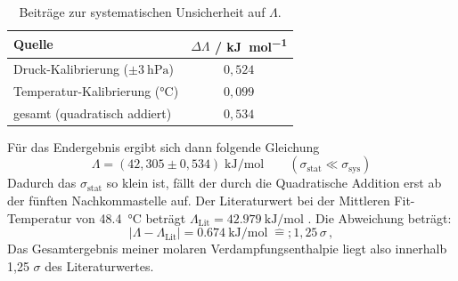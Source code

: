 \documentclass[twoside]{protokoll}
\begin{document}
\begin{table}[htb]
  \centering
  \caption{Beiträge zur systematischen Unsicherheit auf $\Lambda$.}
  \begin{tabular}{lc}
    \toprule
    Quelle & $\Delta\Lambda$ / \si{\kilo\joule\per\mole} \\
    \midrule
    Druck-Kalibrierung ($\pm\SI{3}{\hecto\pascal}$) & $0{,}524$ \\
    Temperatur-Kalibrierung ($\si{\celsius}$) & $0{,}099$ \\
    \midrule
    gesamt (quadratisch addiert) & $0{,}534$ \\
    \bottomrule
  \end{tabular}
\end{table}
\FloatBarrier
Für das Endergebnis ergibt sich dann folgende Gleichung
\begin{equation}
    \Lambda = (42,305 \pm 0,534)\;\si{\kilo\joule\per\mole}
    \qquad (\sigma_{\text{stat}} \ll \sigma_{\text{sys}})
\end{equation}
Dadurch das $\sigma_{\text{stat}}$ so klein ist, fällt der durch die Quadratische Addition erst ab der fünften Nachkommastelle auf.
Der Literaturwert bei der Mittleren Fit-Temperatur von \SI{48.4}{\celsius} beträgt $\Lambda_{\text{Lit}} = \SI{42.979}{\kilo\joule\per\mole}$ . Die Abweichung beträgt:
\begin{equation}
    |\Lambda-\Lambda_{\text{Lit}}| = \SI{0.674}{\kilo\joule\per\mole}
    \;\widehat{=};1,25\,\sigma\, ,
\end{equation}
Das Gesamtergebnis meiner molaren Verdampfungsenthalpie liegt also innerhalb 1,25 $\sigma$ des Literaturwertes.
\end{document}
